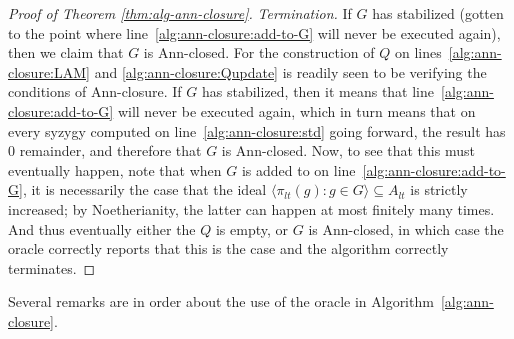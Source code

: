 \documentclass[11pt,reqno]{amsart}
\theoremstyle{definition}
\numberwithin{equation}{section}
\begin{document}
\begin{proof}[Proof of Theorem \ref{thm:alg-ann-closure}]
\textit{Termination.} If $G$ has stabilized (gotten to the point where line~\ref{alg:ann-closure:add-to-G} will never be executed again), then we claim that $G$ is Ann-closed. For the construction of $Q$ on lines~\ref{alg:ann-closure:LAM} and \ref{alg:ann-closure:Qupdate} is readily seen to be verifying the conditions of Ann-closure. If $G$ has stabilized, then it means that  line~\ref{alg:ann-closure:add-to-G} will never be executed again, which in turn means that on every syzygy computed on line~\ref{alg:ann-closure:std} going forward, the result has 0 remainder, and therefore that $G$ is Ann-closed. Now, to see that this must eventually happen, note that when $G$ is added to on line~\ref{alg:ann-closure:add-to-G}, it is necessarily the case that the ideal $\langle \pi_{lt}(g) : g \in G \rangle \subseteq A_{lt}$ is strictly increased; by Noetherianity, the latter can happen at most finitely many times. And thus eventually either the $Q$ is empty, or $G$ is Ann-closed, in which case the oracle correctly reports that this is the case and the algorithm correctly terminates.
\end{proof}

Several remarks are in order about the use of the oracle in Algorithm~\ref{alg:ann-closure}. 
\end{document}
